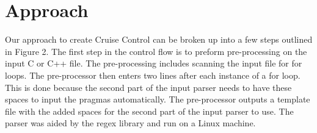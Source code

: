 \documentclass[letterpaper, 10 pt, conference]{IEEEconf}  %
\begin{document}
\section{Approach}
Our approach to create Cruise Control can be broken up into a few steps outlined in Figure 2. The first step in the control flow is to preform pre-processing on the input C or C++ file.  The pre-processing includes scanning the input file for for loops. The pre-processor then enters two lines after each instance of a for loop. This is done because the second part of the input parser needs to have these spaces to input the pragmas automatically. The pre-processor outputs a template file with the added spaces for the second part of the input parser to use. The parser was aided by the regex library and run on a Linux machine.  \newline
\end{document}
